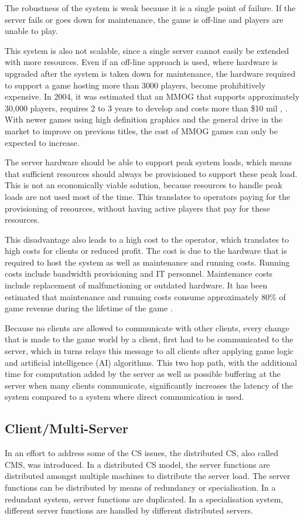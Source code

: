 \documentclass[10pt,a4paper,journal,cspaper,compsoc]{IEEEtran}
\begin{document}
The robustness of the system is weak because it is a single point of failure. If the server fails or goes down for maintenance, the game is off-line
and players are unable to play.

This system is also not scalable, since a single server cannot easily be extended with more resources. Even if an off-line approach is used, where
hardware is upgraded after the system is taken down for maintenance, the hardware required to support a game hosting more than 3000 players, become
prohibitively expensive. In 2004, it was estimated that an MMOG that supports approximately 30,000 players, requires 2 to 3 years to develop and
costs more than \$10 mil \cite{cs_mmog_cost}, \cite{igda_online_whitepaper}. With newer games using high definition graphics and the general drive in
the market to improve on previous titles, the cost of MMOG games can only be expected to increase.

The server hardware should be able to support peak system loads, which means that sufficient resources should always be provisioned to support these
peak load. This is not an economically viable solution, because resources to handle peak loads are not used most of the time. This translates to
operators paying for the provisioning of resources, without having active players that pay for these resources.

This disadvantage also leads to a high cost to the operator, which translates to high costs for clients or reduced profit. The cost is due to the
hardware that is required to host the system as well as maintenance and running costs. Running costs include bandwidth provisioning and IT personnel.
Maintenance costs include replacement of malfunctioning or outdated hardware. It has been estimated that maintenance and running costs consume
approximately 80\% of game revenue during the lifetime of the game \cite{cs_mmog_cost}.

Because no clients are allowed to communicate with other clients, every change that is made to the game world by a client, first had to be
communicated to the server, which in turns relays this message to all clients after applying game logic and artificial intelligence (AI) algorithms.
This two hop path, with the additional time for computation added by the server as well as possible buffering at the server when many clients
communicate, significantly increases the latency of the system compared to a system where direct communication is used.

\subsection{Client/Multi-Server}
In an effort to address some of the \ac{CS} issues, the distributed \ac{CS}, also called \ac{CMS}, was introduced. In a distributed \ac{CS} model,
the server functions are distributed amongst multiple machines to distribute the server load. The server functions can be distributed by means of
redundancy or specialisation. In a redundant system, server functions are duplicated. In a specialisation system, different server functions are
handled by different distributed servers.
\end{document}
